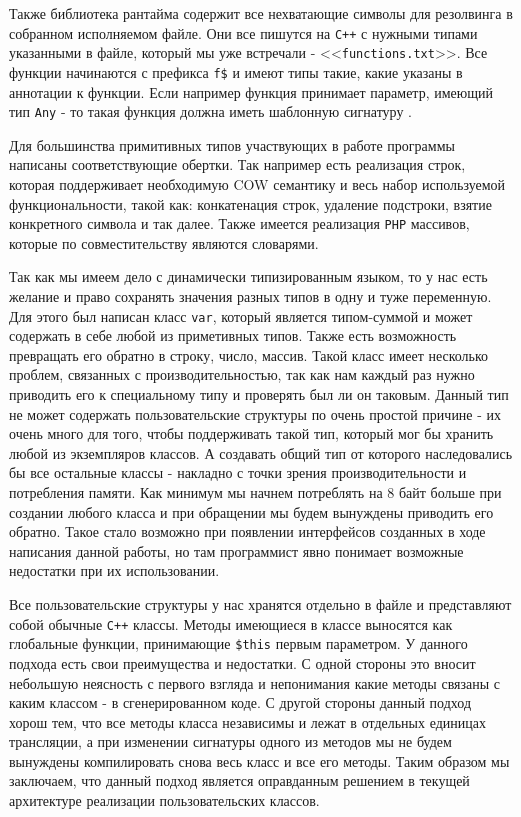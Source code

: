 Также библиотека рантайма содержит все нехватающие символы для резолвинга в собранном исполняемом файле.
Они все пишутся на \verb|C++| с нужными типами указанными в файле, который мы уже встречали - <<\verb|functions.txt|>>.
Все функции начинаются с префикса \verb|f$| и имеют типы такие, какие указаны в аннотации к функции.
Если например функция принимает параметр, имеющий тип \verb|Any| - то такая функция должна иметь шаблонную сигнатуру \cite[с.~665]{Stroustrup}.

Для большинства примитивных типов участвующих в работе программы написаны соответствующие обертки.
Так например есть реализация строк, которая поддерживает необходимую COW \cite{COW} семантику и весь набор используемой функциональности, такой как: конкатенация строк, удаление подстроки, взятие конкретного символа и так далее.
Также имеется реализация \verb|PHP| массивов, которые по совместительству являются словарями.

Так как мы имеем дело с динамически типизированным языком, то у нас есть желание и право сохранять значения разных типов в одну и туже переменную.
Для этого был написан класс \verb|var|, который является типом-суммой и может содержать в себе любой из приметивных типов.
Также есть возможность превращать его обратно в строку, число, массив.
Такой класс имеет несколько проблем, связанных с производительностью, так как нам каждый раз нужно приводить его к специальному типу и проверять был ли он таковым.
Данный тип не может содержать пользовательские структуры по очень простой причине - их очень много для того, чтобы поддерживать такой тип, который мог бы хранить любой из экземпляров классов.
А создавать общий тип от которого наследовались бы все остальные классы - накладно с точки зрения производительности и потребления памяти.
Как минимум мы начнем потреблять на 8 байт больше при создании любого класса и при обращении мы будем вынуждены приводить его обратно.
Такое стало возможно при появлении интерфейсов созданных в ходе написания данной работы, но там программист явно понимает возможные недостатки при их использовании.

Все пользовательские структуры у нас хранятся отдельно в файле и представляют собой обычные \verb|C++| классы.
Методы имеющиеся в классе выносятся как глобальные функции, принимающие \verb|$this| первым параметром.
У данного подхода есть свои преимущества и недостатки.
С одной стороны это вносит небольшую неясность с первого взгляда и непонимания какие методы связаны с каким классом - в сгенерированном коде.
С другой стороны данный подход хорош тем, что все методы класса независимы и лежат в отдельных единицах трансляции, а при изменении сигнатуры одного из методов мы не будем вынуждены компилировать снова весь класс и все его методы.
Таким образом мы заключаем, что данный подход является оправданным решением в текущей архитектуре реализации пользовательских классов.

